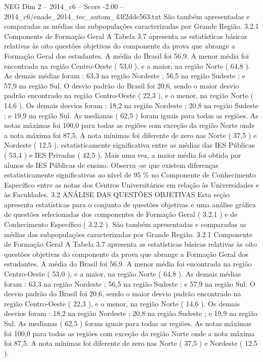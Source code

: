 \begin{textsample}{NEG Dim 2 – 2014\_c6 – Score -2.00 – 2014\_c6/enade\_2014\_tec\_autom\_43f2ddc563.txt}
São também apresentadas e comparadas as médias das subpopulações caracterizadas por Grande Região. 3.2.1 Componente de Formação Geral A Tabela 3.7 apresenta as estatísticas básicas relativas às oito questões objetivas do componente da prova que abrange a Formação Geral dos estudantes.
A média do Brasil foi 56,9.
A menor média foi encontrada na região Centro-Oeste ( 53,0 ), e a maior, na região Norte ( 64,8 ).
As demais médias foram : 63,3 na região Nordeste ; 56,5 na região Sudeste ; e 57,9 na região Sul.
O desvio padrão do Brasil foi 20,6, sendo o maior desvio padrão encontrado na região Centro-Oeste ( 22,3 ), e o menor, na região Norte ( 14,6 ).
Os demais desvios foram : 18,2 na região Nordeste ; 20,8 na região Sudeste ; e 19,9 na região Sul.
As medianas ( 62,5 ) foram iguais para todas as regiões.
As notas máximas foi 100,0 para todas as regiões com exceção da região Norte onde a nota máxima foi 87,5.
A nota mínimas foi diferente de zero nas Norte ( 37,5 ) e Nordeste ( 12,5 ). estatisticamente significativa entre as médias das IES Públicas ( 53,4 ) e IES Privadas ( 42,5 ).
Mais uma vez, a maior média foi obtida por alunos de IES Públicas de ensino.
Observa -se que existem diferenças estatisticamente significativas ao nível de 95 \% no Componente de Conhecimento Específico entre as notas dos Centros Universitários em relação às Universidades e às Faculdades. 3.2 ANÁLISE DAS QUESTÕES OBJETIVAS Esta seção apresenta estatísticas para o conjunto de questões objetivas e uma análise gráfica de questões selecionadas dos componentes de Formação Geral ( 3.2.1 ) e de Conhecimento Específico ( 3.2.2 ).
São também apresentadas e comparadas as médias das subpopulações caracterizadas por Grande Região. 3.2.1 Componente de Formação Geral A Tabela 3.7 apresenta as estatísticas básicas relativas às oito questões objetivas do componente da prova que abrange a Formação Geral dos estudantes.
A média do Brasil foi 56,9.
A menor média foi encontrada na região Centro-Oeste ( 53,0 ), e a maior, na região Norte ( 64,8 ).
As demais médias foram : 63,3 na região Nordeste ; 56,5 na região Sudeste ; e 57,9 na região Sul.
O desvio padrão do Brasil foi 20,6, sendo o maior desvio padrão encontrado na região Centro-Oeste ( 22,3 ), e o menor, na região Norte ( 14,6 ).
Os demais desvios foram : 18,2 na região Nordeste ; 20,8 na região Sudeste ; e 19,9 na região Sul.
As medianas ( 62,5 ) foram iguais para todas as regiões.
As notas máximas foi 100,0 para todas as regiões com exceção da região Norte onde a nota máxima foi 87,5.
A nota mínimas foi diferente de zero nas Norte ( 37,5 ) e Nordeste ( 12,5 ).

\end{textsample}
